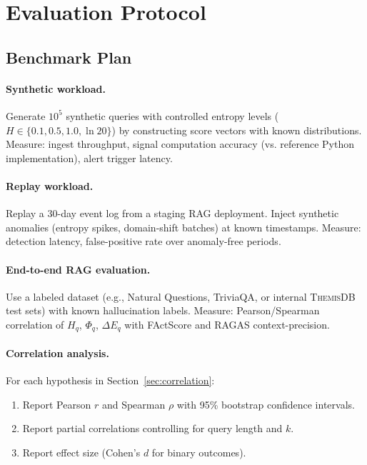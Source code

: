 \documentclass[11pt,a4paper]{article}
\newcommand{\themisdb}{\textsc{ThemisDB}}
\theoremstyle{definition}
\begin{document}
\section{Evaluation Protocol}
\label{sec:evaluation}

\subsection{Benchmark Plan}

\paragraph{Synthetic workload.}
Generate $10^5$ synthetic queries with controlled entropy levels
($H \in \{0.1, 0.5, 1.0, \ln 20\}$) by constructing score vectors with
known distributions.
Measure: ingest throughput, signal computation accuracy (vs. reference
Python implementation), alert trigger latency.

\paragraph{Replay workload.}
Replay a 30-day event log from a staging RAG deployment.
Inject synthetic anomalies (entropy spikes, domain-shift batches) at
known timestamps.
Measure: detection latency, false-positive rate over anomaly-free periods.

\paragraph{End-to-end RAG evaluation.}
Use a labeled dataset (e.g., Natural Questions, TriviaQA, or internal
\themisdb{} test sets) with known hallucination labels.
Measure: Pearson/Spearman correlation of $H_q$, $\Phi_q$, $\Delta E_q$
with FActScore and RAGAS context-precision.

\paragraph{Correlation analysis.}
For each hypothesis in Section~\ref{sec:correlation}:
\begin{enumerate}[noitemsep]
  \item Report Pearson $r$ and Spearman $\rho$ with 95\% bootstrap
    confidence intervals.
  \item Report partial correlations controlling for query length and
    $k$.
  \item Report effect size (Cohen's $d$ for binary outcomes).
\end{enumerate}
\end{document}
